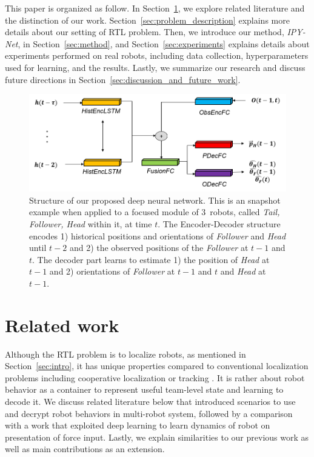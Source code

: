 \documentclass[letterpaper, 10 pt, conference]{ieeeconf}  %
\begin{document}
	This paper is organized as follow. 
	In Section~\ref{sec:related_work}, we explore related literature and the distinction of our work. 
	Section~\ref{sec:problem_description} explains more details about our setting of RTL problem. 
	Then, we introduce our method, \emph{IPY-Net}, in Section~\ref{sec:method}, and 
	Section~\ref{sec:experiments} explains details about experiments performed on real robots, 
	including data collection, hyperparameters used for learning, and the results. 
	Lastly, we summarize our research and discuss future directions 
	in Section~\ref{sec:discussion_and_future_work}.

	\begin{figure}\centering
		\includegraphics[width=1.\columnwidth]{fig_DL_Pipeline}
		\caption{Structure of our proposed deep neural network. 
			This is an snapshot example when applied to a focused module of
			$3$~robots, called \emph{Tail, Follower, Head} within it, at time $t$. 
			The Encoder-Decoder structure encodes
			1) historical positions and orientations of \emph{Follower} and \emph{Head} 
			until $t-2$ and 2) the observed positions of the \emph{Follower} at $t-1$ and $t$. 
			The decoder part learns to estimate 1) the position of \emph{Head} at $t-1$ and 
			2) orientations of \emph{Follower} at $t-1$ and $t$ and \emph{Head} at $t-1$.   
		}
		\label{fig:DL_Pipeline}
	\end{figure}
	
	
	\section{Related work}
	\label{sec:related_work}
	
	Although the RTL problem is to localize robots, as mentioned in 
	Section~\ref{sec:intro}, it has unique properties compared to conventional 
	localization problems including	cooperative localization or tracking 
	\cite{LSRB16, FSDO10, CX14, DMG15}. 
	It is rather about robot behavior as a container to 
	represent useful team-level state and learning to decode it.
	We discuss related literature below that introduced scenarios to use and decrypt 
	robot behaviors in multi-robot system, followed by a comparison with a work 
	that exploited deep learning to learn dynamics of robot on presentation 
	of force input. 
	Lastly, we explain similarities to our previous work as well as main 
	contributions as an extension.  
\end{document}

